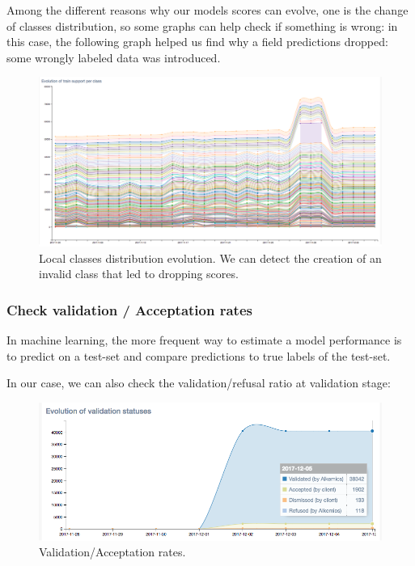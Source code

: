 Among the different reasons why our models scores can evolve, one is the change of classes distribution, so some graphs can help check if something is wrong: in this case, the following graph helped us find why a field predictions dropped: some wrongly labeled data was introduced.

\begin{figure}[H]
\centering
\includegraphics[scale=0.30]{./images/monitoring/local-classes-evolution.png}
\caption{Local classes distribution evolution. We can detect the creation of an invalid class that led to dropping scores.}
\end{figure}


\subsubsection{Check validation / Acceptation rates}

In machine learning, the more frequent way to estimate a model performance is to predict on a test-set and compare predictions to true labels of the test-set.

In our case, we can also check the validation/refusal ratio at validation stage:

\begin{figure}[H]
\centering
\includegraphics[scale=0.50]{./images/monitoring/validation-acceptation-monitoring.png}
\caption{Validation/Acceptation rates.}
\end{figure}


